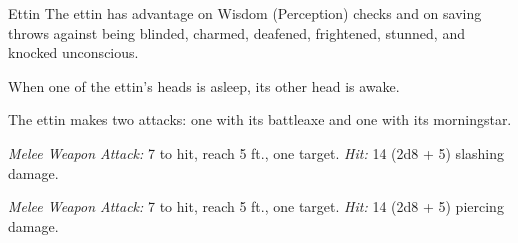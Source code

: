 \documentclass[10pt,a4paper,twoside,bg=print,twocolumn,openany,nodeprecatedcode]{dndbook}
\begin{document}
\begin{DndMonster}[float=t]{Ettin}
\DndMonsterBasics[
armor-class = {12 (natural armor)},
hit-points = {\DndDice{10d10 + 30}},
speed = {40 ft.}
]
\DndMonsterAbilityScores[
 str = 21,
 dex = 8,
 con = 17,
 int = 6,
 wis = 10,
 cha = 8
]
\DndMonsterDetails[
skills = {Perception +4},
senses = {darkvision 60 ft., passive perception 14},
languages = {Giant, Orc},
challenge = 4,
]
The ettin has advantage on Wisdom (Perception) checks and on saving throws against being blinded, charmed, deafened, frightened, stunned, and knocked unconscious.

When one of the ettin's heads is asleep, its other head is awake.

The ettin makes two attacks: one with its battleaxe and one with its morningstar.

\textsl{Melee Weapon Attack:} 7 to hit, reach 5 ft., one target. \textsl{Hit:} 14 (2d8 + 5) slashing damage.

\textsl{Melee Weapon Attack:} 7 to hit, reach 5 ft., one target. \textsl{Hit:} 14 (2d8 + 5) piercing damage.

\end{DndMonster}
\end{document}
